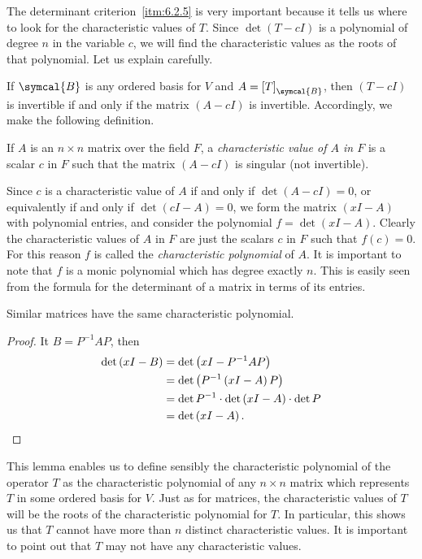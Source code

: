 The determinant criterion~\ref{itm:6.2.5} is very important because it tells us where to look for the characteristic values of \(T\). Since \(\det\left(T-cI\right)\) is a polynomial of degree \(n\) in the variable \(c\), we will find the characteristic values as the roots of that polynomial. Let us explain carefully.

If \(\symcal{B}\) is any ordered basis for \(V\) and \(A=\left[T\right]_{\symcal{B}}\), then \(\left(T-cI\right)\) is invertible if and only if the matrix \(\left(A-cI\right)\) is invertible. Accordingly, we make the following definition.

\begin{definition}
    If \(A\) is an \(n\times n\) matrix over the field \(F\), a \emph{characteristic value of \(A\) in \(F\)} is a scalar \(c\) in \(F\) such that the matrix \(\left(A-cI\right)\) is singular (not invertible).
\end{definition}

Since \(c\) is a characteristic value of \(A\) if and only if \(\det\left(A-cI\right)=0\), or equivalently if and only if \(\det\left(cI-A\right)=0\), we form the matrix \(\left(xI-A\right)\) with polynomial entries, and consider the polynomial \(f=\det\left(xI-A\right)\). Clearly the characteristic values of \(A\) in \(F\) are just the scalars \(c\) in \(F\) such that \(f\left(c\right)=0\). For this reason \(f\) is called the \emph{characteristic polynomial} of \(A\). It is important to note that \(f\) is a monic polynomial which has degree exactly \(n\). This is easily seen from the formula for the determinant of a matrix in terms of its entries.

\begin{lemma}
    Similar matrices have the same characteristic polynomial.
\end{lemma}

\begin{proof}
    It \(B=P^{-1}AP\), then
    \begin{align*}
        \det\left(xI-B\right)&=\det\left(xI-P^{-1}AP\right)\\
        &=\det\left(P^{-1}\left(xI-A\right)P\right)\\
        &=\det P^{-1}\cdot\det\left(xI-A\right)\cdot\det P\\
        &=\det\left(xI-A\right).\qedhere
    \end{align*}
\end{proof}

This lemma enables us to define sensibly the characteristic polynomial of the operator \(T\) as the characteristic polynomial of any \(n\times n\) matrix which represents \(T\) in some ordered basis for \(V\). Just as for matrices, the characteristic values of \(T\) will be the roots of the characteristic polynomial for \(T\). In particular, this shows us that \(T\) cannot have more than \(n\) distinct characteristic values. It is important to point out that \(T\) may not have any characteristic values.

